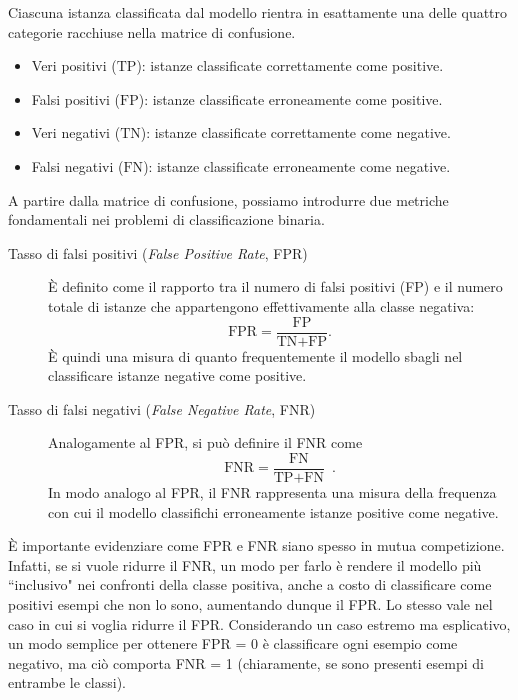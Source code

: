 Ciascuna istanza classificata dal modello rientra in esattamente una delle quattro categorie racchiuse nella matrice di confusione.
\begin{itemize}
    \item Veri positivi ($\text{TP}$): istanze classificate correttamente come positive.
    \item Falsi positivi ($\text{FP}$): istanze classificate erroneamente come positive.
    \item Veri negativi ($\text{TN}$): istanze classificate correttamente come negative.
    \item Falsi negativi ($\text{FN}$): istanze classificate erroneamente come negative.
\end{itemize}

A partire dalla matrice di confusione, possiamo introdurre due metriche fondamentali nei problemi di classificazione binaria.
\begin{description}
    \item[Tasso di falsi positivi (\textit{False Positive Rate}, FPR)] È definito come il rapporto tra il numero di falsi positivi (FP) e il numero totale di istanze che appartengono effettivamente alla classe negativa:
    \begin{equation}
        \text{FPR} = \frac{\text{FP}}{\text{TN}+\text{FP}} .
    \end{equation}
    È quindi una misura di quanto frequentemente il modello sbagli nel classificare istanze negative come positive.
    
    \item[Tasso di falsi negativi (\textit{False Negative Rate}, FNR)] Analogamente al FPR, si può definire il FNR come
    \begin{equation}
        \text{FNR} = \frac{\text{FN}}{\text{TP}+\text{FN}} \enspace.
    \end{equation}
    In modo analogo al FPR, il FNR rappresenta una misura della frequenza con cui il modello classifichi erroneamente istanze positive come negative.
\end{description}
È importante evidenziare come FPR e FNR siano spesso in mutua competizione. 
Infatti, se si vuole ridurre il FNR, un modo per farlo è rendere il modello più ``inclusivo" nei confronti della classe positiva, anche a costo di classificare come positivi esempi che non lo sono, aumentando dunque il FPR. Lo stesso vale nel caso in cui si voglia ridurre il FPR.
Considerando un caso estremo ma esplicativo, un modo semplice per ottenere FPR = 0 è classificare ogni esempio come negativo, ma ciò comporta FNR = 1 (chiaramente, se sono presenti esempi di entrambe le classi).




